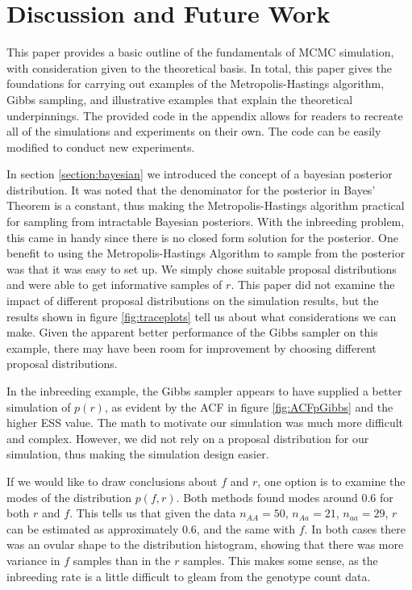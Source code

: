 \documentclass[11pt]{amsart}
\theoremstyle{theorem} %
\theoremstyle{definition}                  %
\theoremstyle{example}                       %
\theoremstyle{remark}                       %
\numberwithin{equation}{section}
\begin{document}
    \section{Discussion and Future Work}
    

    This paper provides a basic outline of the fundamentals of MCMC simulation, with consideration given to the theoretical basis. In total, this paper gives the foundations for carrying out examples of the Metropolis-Hastings algorithm, Gibbs sampling, and illustrative examples that explain the theoretical underpinnings. The provided code in the appendix allows for readers to recreate all of the simulations and experiments on their own. The code can be easily modified to conduct new experiments. 
    

    In section \ref{section:bayesian} we introduced the concept of a bayesian posterior distribution. It was noted that the denominator for the posterior in Bayes' Theorem is a constant, thus making the Metropolis-Hastings algorithm practical for sampling from intractable Bayesian posteriors. With the inbreeding problem, this came in handy since there is no closed form solution for the posterior. One benefit to using the Metropolis-Hastings Algorithm to sample from the posterior was that it was easy to set up. We simply chose suitable proposal distributions and were able to get informative samples of $r$. This paper did not examine the impact of different proposal distributions on the simulation results, but the results shown in figure \ref{fig:traceplots} tell us about what considerations we can make. Given the apparent better performance of the Gibbs sampler on this example, there may have been room for improvement by choosing different proposal distributions.
    
    In the inbreeding example, the Gibbs sampler appears to have supplied a better simulation of $p(r)$, as evident by the ACF in figure \ref{fig:ACFpGibbs} and the higher ESS value. The math to motivate our simulation was much more difficult and complex. However, we did not rely on a proposal distribution for our simulation, thus making the simulation design easier. 
    
    If we would like to draw conclusions about $f$ and $r$, one option is to examine the modes of the distribution $p(f,r)$. Both methods found modes around $0.6$ for both $r$ and $f$. This tells us that given the data $n_{AA}=50$, $n_{Aa}=21$, $n_{aa}=29$, $r$ can be estimated as approximately $0.6$, and the same with $f$. In both cases there was an ovular shape to the distribution histogram, showing that there was more variance in $f$ samples than in the $r$ samples. This makes some sense, as the inbreeding rate is a little difficult to gleam from the genotype count data.
    
\end{document}
